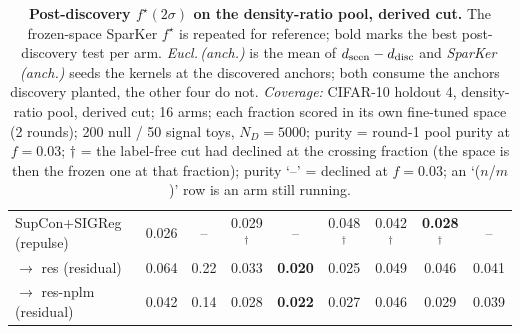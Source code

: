 \begin{table}[t]
\begin{tabular}{lcccccccc}
\addlinespace
SupCon+SIGReg (repulse) & 0.026 & -- & 0.029$^\dagger$ & -- & 0.048$^\dagger$ & 0.042$^\dagger$ & \textbf{0.028$^\dagger$} & -- \\
\quad $\to$ res (residual) & 0.064 & 0.22 & 0.033 & \textbf{0.020} & 0.025 & 0.049 & 0.046 & 0.041 \\
\quad $\to$ res-nplm (residual) & 0.042 & 0.14 & 0.028 & \textbf{0.022} & 0.027 & 0.046 & 0.029 & 0.039 \\
\bottomrule
\end{tabular}
\caption{\textbf{Post-discovery $f^\star(2\sigma)$ on the density-ratio pool, derived cut.} The frozen-space SparKer $f^\star$ is repeated for reference; bold marks the best post-discovery test per arm. \emph{Eucl.\,(anch.)} is the mean of $d_{\rm seen}-d_{\rm disc}$ and \emph{SparKer\,(anch.)} seeds the kernels at the discovered anchors; both consume the anchors discovery planted, the other four do not. \emph{Coverage:} CIFAR-10 holdout 4, density-ratio pool, derived cut; 16 arms; each fraction scored in its own fine-tuned space (2 rounds); 200 null / 50 signal toys, $N_D{=}5000$; purity = round-1 pool purity at $f{=}0.03$; $\dagger$ = the label-free cut had declined at the crossing fraction (the space is then the frozen one at that fraction); purity `--' = declined at $f{=}0.03$; an `($n$/$m$)' row is an arm still running.}
\label{tab:sigma_post_cifar10_h4_np-legal}
\end{table}
